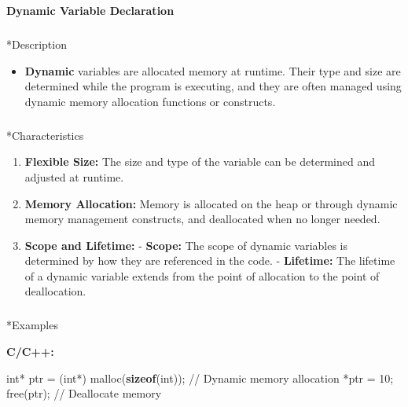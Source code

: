 \documentclass[
  letterpaper,
  DIV=11,
  numbers=noendperiod]{scrreprt}
\makeatletter
\let\oldsubparagraph\subparagraph
\renewcommand{\subparagraph}{
    \@ifstar
      \xxxSubParagraphStar
      \xxxSubParagraphNoStar
  }
\newcommand{\xxxSubParagraphStar}[1]{\oldsubparagraph*{#1}\mbox{}}
\newcommand{\xxxSubParagraphNoStar}[1]{\oldsubparagraph{#1}\mbox{}}
\newenvironment{Shaded}{\begin{snugshade}}{\end{snugshade}}
\newcommand{\CommentTok}[1]{\textcolor[rgb]{0.37,0.37,0.37}{#1}}
\newcommand{\DataTypeTok}[1]{\textcolor[rgb]{0.68,0.00,0.00}{#1}}
\newcommand{\DecValTok}[1]{\textcolor[rgb]{0.68,0.00,0.00}{#1}}
\newcommand{\KeywordTok}[1]{\textcolor[rgb]{0.00,0.23,0.31}{\textbf{#1}}}
\newcommand{\NormalTok}[1]{\textcolor[rgb]{0.00,0.23,0.31}{#1}}
\newcommand{\OperatorTok}[1]{\textcolor[rgb]{0.37,0.37,0.37}{#1}}
\providecommand{\tightlist}{%
  \setlength{\itemsep}{0pt}\setlength{\parskip}{0pt}}
\makeatother
\begin{document}
\begin{tcolorbox}[enhanced jigsaw, colframe=quarto-callout-note-color-frame, toprule=.15mm, bottomrule=.15mm, rightrule=.15mm, colback=white, breakable, arc=.35mm, opacityback=0, left=2mm, leftrule=.75mm]

\vspace{-3mm}\textbf{Dynamic Variable Declaration}\vspace{3mm}

\subparagraph*{Description}\label{description-11}

\begin{itemize}
\tightlist
\item
  \textbf{Dynamic} variables are allocated memory at runtime. Their type
  and size are determined while the program is executing, and they are
  often managed using dynamic memory allocation functions or constructs.
\end{itemize}

\subparagraph*{Characteristics}\label{characteristics-1}

\begin{enumerate}
\def\labelenumi{\arabic{enumi}.}
\tightlist
\item
  \textbf{Flexible Size:} The size and type of the variable can be
  determined and adjusted at runtime.
\item
  \textbf{Memory Allocation:} Memory is allocated on the heap or through
  dynamic memory management constructs, and deallocated when no longer
  needed.
\item
  \textbf{Scope and Lifetime:} - \textbf{Scope:} The scope of dynamic
  variables is determined by how they are referenced in the code. -
  \textbf{Lifetime:} The lifetime of a dynamic variable extends from the
  point of allocation to the point of deallocation.
\end{enumerate}

\subparagraph*{Examples}\label{examples-7}

\textbf{C/C++:}

\begin{Shaded}
\begin{Highlighting}[]
\DataTypeTok{int}\OperatorTok{*}\NormalTok{ ptr }\OperatorTok{=} \OperatorTok{(}\DataTypeTok{int}\OperatorTok{*)}\NormalTok{ malloc}\OperatorTok{(}\KeywordTok{sizeof}\OperatorTok{(}\DataTypeTok{int}\OperatorTok{));} \CommentTok{// Dynamic memory allocation}
\OperatorTok{*}\NormalTok{ptr }\OperatorTok{=} \DecValTok{10}\OperatorTok{;}
\NormalTok{free}\OperatorTok{(}\NormalTok{ptr}\OperatorTok{);} \CommentTok{// Deallocate memory}
\end{Highlighting}
\end{Shaded}


\end{tcolorbox}
\end{document}
